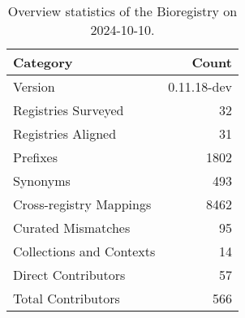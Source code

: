 \begin{table}
\caption{Overview statistics of the Bioregistry on 2024-10-10.}
\label{tab:bioregistry-summary}
\begin{tabular}{lr}
\toprule
Category & Count \\
\midrule
Version & 0.11.18-dev \\
Registries Surveyed & 32 \\
Registries Aligned & 31 \\
Prefixes & 1802 \\
Synonyms & 493 \\
Cross-registry Mappings & 8462 \\
Curated Mismatches & 95 \\
Collections and Contexts & 14 \\
Direct Contributors & 57 \\
Total Contributors & 566 \\
\bottomrule
\end{tabular}
\end{table}
